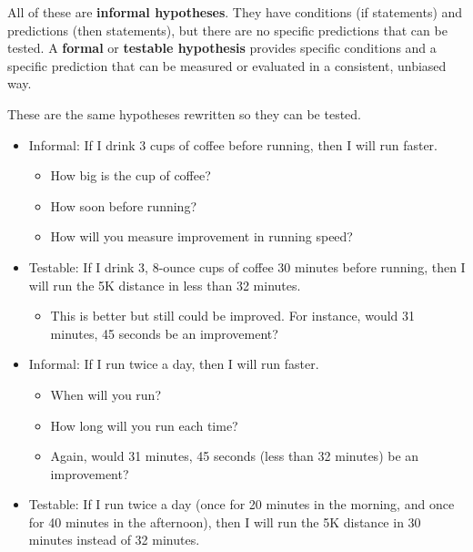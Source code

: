 \documentclass[
]{book}
\providecommand{\tightlist}{%
  \setlength{\itemsep}{0pt}\setlength{\parskip}{0pt}}
\begin{document}
All of these are \textbf{informal hypotheses}. They have conditions (if statements) and predictions (then statements), but there are no specific predictions that can be tested. A \textbf{formal} or \textbf{testable hypothesis} provides specific conditions and a specific prediction that can be measured or evaluated in a consistent, unbiased way.

These are the same hypotheses rewritten so they can be tested.

\begin{itemize}
\tightlist
\item
  Informal: If I drink 3 cups of coffee before running, then I will run faster.

  \begin{itemize}
  \tightlist
  \item
    How big is the cup of coffee?
  \item
    How soon before running?
  \item
    How will you measure improvement in running speed?
  \end{itemize}
\item
  Testable: If I drink 3, 8-ounce cups of coffee 30 minutes before running, then I will run the 5K distance in less than 32 minutes.

  \begin{itemize}
  \tightlist
  \item
    This is better but still could be improved. For instance, would 31 minutes, 45 seconds be an improvement?
  \end{itemize}
\end{itemize}

\begin{itemize}
\tightlist
\item
  Informal: If I run twice a day, then I will run faster.

  \begin{itemize}
  \tightlist
  \item
    When will you run?
  \item
    How long will you run each time?
  \item
    Again, would 31 minutes, 45 seconds (less than 32 minutes) be an improvement?
  \end{itemize}
\item
  Testable: If I run twice a day (once for 20 minutes in the morning, and once for 40 minutes in the afternoon), then I will run the 5K distance in 30 minutes instead of 32 minutes.
\end{itemize}
\end{document}
